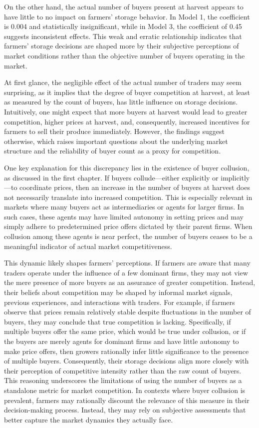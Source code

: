On the other hand, the actual number of buyers present at harvest appears to have little to no impact on farmers' storage behavior. In Model 1, the coefficient is 0.004 and statistically insignificant, while in Model 3, the coefficient of 0.45 suggests inconsistent effects. This weak and erratic relationship indicates that farmers’ storage decisions are shaped more by their subjective perceptions of market conditions rather than the objective number of buyers operating in the market.

At first glance, the negligible effect of the actual number of traders may seem surprising, as it implies that the degree of buyer competition at harvest, at least as measured by the count of buyers, has little influence on storage decisions. Intuitively, one might expect that more buyers at harvest would lead to greater competition, higher prices at harvest, and, consequently, increased incentives for farmers to sell their produce immediately. However, the findings suggest otherwise, which raises important questions about the underlying market structure and the reliability of buyer count as a proxy for competition.

One key explanation for this discrepancy lies in the existence of buyer collusion, as discussed in the first chapter. If buyers collude—either explicitly or implicitly—to coordinate prices, then an increase in the number of buyers at harvest does not necessarily translate into increased competition. This is especially relevant in markets where many buyers act as intermediaries or agents for larger firms. In such cases, these agents may have limited autonomy in setting prices and may simply adhere to predetermined price offers dictated by their parent firms. When collusion among these agents is near perfect, the number of buyers ceases to be a meaningful indicator of actual market competitiveness.

This dynamic likely shapes farmers' perceptions. If farmers are aware that many traders operate under the influence of a few dominant firms, they may not view the mere presence of more buyers as an assurance of greater competition. Instead, their beliefs about competition may be shaped by informal market signals, previous experiences, and interactions with traders. For example, if farmers observe that prices remain relatively stable despite fluctuations in the number of buyers, they may conclude that true competition is lacking. Specifically, if multiple buyers offer the same price, which would be true under collusion, or if the buyers are merely agents for dominant firms and have little autonomy to make price offers, then growers rationally infer little significance to the presence of multiple buyers. Consequently, their storage decisions align more closely with their perception of competitive intensity rather than the raw count of buyers. This reasoning underscores the limitations of using the number of buyers as a standalone metric for market competition. In contexts where buyer collusion is prevalent, farmers may rationally discount the relevance of this measure in their decision-making process. Instead, they may rely on subjective assessments that better capture the market dynamics they actually face.  

